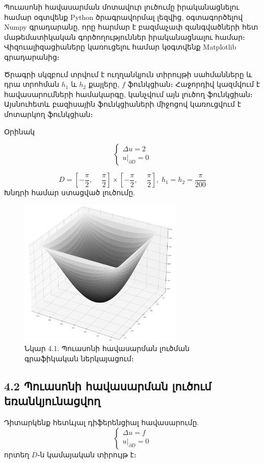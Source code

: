 \documentclass[fleqn, bachelor,subf,12pt,notitlepage]{article}
\begin{document}
Պուասոնի հավասարման մոտավուր լուծումը իրականացնելու համար օգտվենք Python ծրագրավորմալ լեզվից, օգտագործելով Numpy գրադարանը, որը հարմար է բազմաչափ զանգվածների հետ մաթեմատիկական գործողություններ իրականացնալու համար։ Վիզուալիզացիաները կառուցելու համար կօգտվենք Matplotlib գրադարանից։

Ծրագրի սկզբում տրվում է ուղղանկյուն տիրույթի սահմանները և դրա տրոհման $h_{1}$ և $h_{2}$ քայլերը, $f$ ֆունկցիան։ Հաջորդիվ կազմվում է հավասարումների համակարգը, կանչվում այն լուծող ֆունկցիան։ Այսնուհետև բազիսային ֆունկցիաների միջոցով կառուցվում է մոտարկող ֆունկցիան։

Օրինակ


				$$
					\begin{cases}
								\Delta u =2 \\
								u \Big |_{\partial D} = 0
					\end{cases}
				$$

				$$ D = \left[-\dfrac{\pi}{2}, \phantom{-}\dfrac{\pi}{2}\right] \times \left[-\dfrac{\pi}{2}, \phantom{-}\dfrac{\pi}{2}\right], \; h_{1}=h_{2}=\dfrac{\pi}{200}$$
Խնդրի համար ստացված լուծումը.
\begin{figure}[H]
\centering
\includegraphics[width=0.7\textwidth]{images/poisson_solution}
\captionsetup{labelformat=empty}
\caption{Նկար 4.1. Պուասոնի հավասարման լուծման գրաֆիկական ներկայացում։}
\end{figure}
\newpage
\subsection*{4.2 Պուասոնի հավասարման լուծում եռանկյունացվող}

Դիտարկենք հետևյալ դիֆերենցիալ հավասարումը.
\begin{equation}
\begin{cases}
			\Delta u =f \\
			u \Big |_{\partial D} = 0
\end{cases}
\end{equation}
որտեղ $D$֊ն կամայական տիրույթ է։
\end{document}
